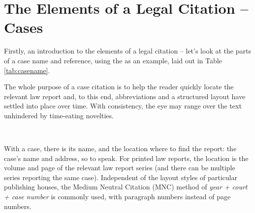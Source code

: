 \section{The Elements of a Legal Citation -- Cases}
Firstly, an introduction to the elements of a legal citation -- let's look at the parts of a case name and reference, using the 
as an example, laid out in Table \ref{tab:casename}.

The whole purpose of a case citation is to help the reader quickly locate the relevant law report and, to this end, abbreviations and a structured layout have settled into place over time. With consistency, the eye may range over the text unhindered by time-eating novelties.
\bigskip

\hfill{}\hfill\ 
\bigskip


With a case, there is its name, and the location where to find the report: the case's name and address, so to speak. For printed law reports, the location is the volume and page of the relevant law report series (and there can be multiple series reporting the same case). Independent of the layout styles of particular publishing houses, the Medium Neutral Citation (MNC) method of \textit{year + court + case number} is commonly used, with paragraph numbers instead of page numbers.

